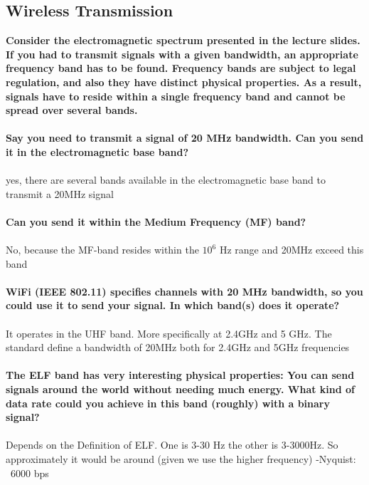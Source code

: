 \documentclass[a4paper,12pt]{article}
\begin{document}
\subsection{Wireless Transmission}
\textbf{Consider the electromagnetic spectrum presented in the lecture slides. If you had to transmit signals  with  a  given  bandwidth, an appropriate frequency band has to be found. Frequency bands are subject to legal regulation, and also they have distinct physical properties. As a result, signals have to reside within a single frequency band and cannot be spread over several bands.}\\
\\
\textbf{Say you need to transmit a signal of 20 MHz bandwidth. Can you send it in the electromagnetic base band?}\\
\\
yes, there are several bands available in the electromagnetic base band to transmit a 20MHz signal\\
\\
\textbf{Can you send it within the Medium Frequency (MF) band?}\\
\\
No, because the MF-band resides within the $10^6$ Hz range and 20MHz exceed this band\\
\\
\textbf{WiFi (IEEE 802.11) specifies channels with 20 MHz bandwidth, so you could use it to send your signal. In which band(s) does it operate?}\\
\\
It operates in the UHF band. More specifically at 2.4GHz and 5 GHz. The standard define a bandwidth of 20MHz both for 2.4GHz and 5GHz frequencies\\
\\
\textbf{The ELF band has very interesting physical properties: You can send signals around the world  without needing much energy.  What kind  of data rate could you achieve in this  band (roughly) with a binary signal?}\\
\\
Depends on the Definition of ELF. One is 3-30 Hz the other is 3-3000Hz.
So approximately it would be around (given we use the higher frequency)
-Nyquist: ~6000 bps
\end{document}
